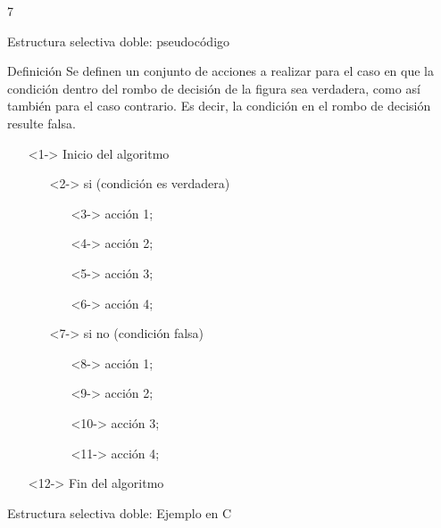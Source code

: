 7\documentclass[xcolor=pdftex,table,11pt]{beamer}
\begin{document}
\begin{frame}{Estructura selectiva doble: pseudocódigo}
\begin{block}{Definición}
Se definen un conjunto de acciones a realizar para el caso en que la condición dentro del rombo de decisión de la figura sea verdadera, como así también para el caso contrario. Es decir, la condición en el rombo de decisión resulte falsa.
\end{block}

 \begin{itemize}
   \item[]<1-> Inicio del algoritmo

   \begin{itemize}
   
     	\item[]<2-> si (condición es verdadera)
     	\begin{itemize}
     			\item[]<3->  acción 1;
     			\item[]<4->  acción 2;
     			\item[]<5->  acción 3;
     			\item[]<6->  acción 4;
     	\end{itemize}
          	\item[]<7-> si no (condición falsa)
     	\begin{itemize}
     			\item[]<8->  acción 1;
     			\item[]<9->  acción 2;
     			\item[]<10->  acción 3;
     			\item[]<11->  acción 4;
     	\end{itemize}
   \end{itemize}
  \item[]<12-> Fin del algoritmo
\end{itemize}

\end{frame}



\begin{frame}{Estructura selectiva doble: Ejemplo en C}
\codesetstylefrombeamer
{}
\end{frame}
\end{document}

